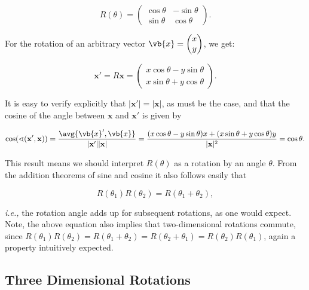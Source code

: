 \documentclass[a4paper,12pt]{report}
\begin{document}
\begin{equation}
R(\theta) = \begin{pmatrix} \cos \theta & -\sin \theta \\ \sin \theta & \cos \theta \end{pmatrix}.
\end{equation}

For the rotation of an arbitrary vector \(\vb{x} = \begin{pmatrix}
     x \\
     y \\
\end{pmatrix}\), we get:

\begin{equation}
\mathbf{x}' = R\mathbf{x} = \begin{pmatrix} x \cos \theta - y \sin \theta \\ x \sin \theta + y \cos \theta \end{pmatrix}.
\end{equation}

It is easy to verify explicitly that \(|\mathbf{x}'| = |\mathbf{x}|\), as must be the case, and that the cosine of the angle between \(\mathbf{x}\) and \(\mathbf{x}'\) is given by

\begin{equation}
\cos(\sphericalangle (\mathbf{x}', \mathbf{x} )) = \frac{\avg{\vb{x} ',\vb{x} } }{|\mathbf{x}'||\mathbf{x}|} = \frac{(x \cos \theta - y \sin \theta)x + (x \sin \theta + y \cos \theta)y}{|\mathbf{x}|^2} = \cos \theta.
\end{equation}

This result means we should interpret \(R(\theta)\) as a rotation by an angle \(\theta\). From the addition theorems of sine and cosine it also follows easily that

\begin{equation}
R(\theta_1)R(\theta_2) = R(\theta_1 + \theta_2),
\end{equation}

\textit{i.e.,} the rotation angle adds up for subsequent rotations, as one would expect. Note, the above equation also implies that two-dimensional rotations commute, since \(R(\theta_1)R(\theta_2) = R(\theta_1 + \theta_2) = R(\theta_2 + \theta_1) = R(\theta_2)R(\theta_1)\), again a property intuitively expected.

\subsection{Three Dimensional Rotations}
\end{document}
